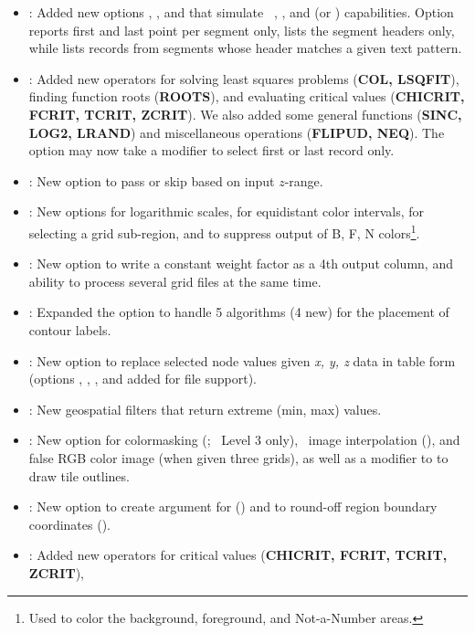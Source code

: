 \begin{description}
\begin{itemize}
\item {}:	Added new options , ,  and  that simulate
\UNIX\ , , and   (or ) capabilities.
Option  reports first and last point per segment only,  lists the segment headers only,
while  lists records from segments whose header matches a given text pattern.
\item {}:	Added new operators for solving least squares problems ({\bf COL, LSQFIT}),
finding function roots ({\bf ROOTS}), and evaluating critical values ({\bf CHICRIT, FCRIT, TCRIT, ZCRIT}).
We also added some general functions ({\bf SINC, LOG2, LRAND}) and miscellaneous operations ({\bf FLIPUD, NEQ}).
The  option may now take a modifier to select first or last record only.
\item {}:	New option   to pass or skip based on input $z$-range.
\item {}:	New options   for logarithmic scales,  for equidistant color
intervals,  for selecting a grid sub-region, and  to suppress output of B, F, N colors\footnote{Used
to color the background, foreground, and Not-a-Number areas.}.
\item {}:	New option  to write a constant weight factor as a 4th output column,
and ability to process several grid files at the same time.
\item {}:	Expanded the  option to handle 5 algorithms (4 new) for the placement
of contour labels. 
\item {}:	New option  to replace selected node values given {\it x, y, z} data
in table form (options , , , and \Opt{:} added for file support).
\item {}:	New geospatial filters  that return extreme (min, max) values. 
\item {}:	New option for colormasking (; \PS\ Level 3 only), \PS\ image 
interpolation (), and false RGB color image (when given three grids), as well as a modifier to 
to draw tile outlines.
\item {}:	New option to create argument for  () and to round-off
region boundary coordinates (). 
\item {}:	Added new operators for critical values ({\bf CHICRIT, FCRIT, TCRIT, ZCRIT}),

\end{itemize}
\end{description}
